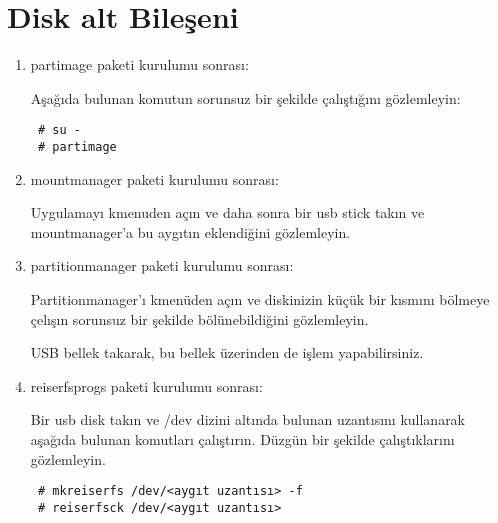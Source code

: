 \documentclass[a4paper,10pt]{article}
\begin{document}
\section{Disk alt Bileşeni}
\begin{enumerate}
 \item partimage paketi kurulumu sonrası:

Aşağıda bulunan komutun sorunsuz bir şekilde çalıştığını gözlemleyin:
\begin{verbatim}
 # su -
 # partimage
\end{verbatim}


 \item mountmanager paketi kurulumu sonrası:

Uygulamayı kmenuden açın ve daha sonra bir usb stick takın ve mountmanager'a bu aygıtın eklendiğini gözlemleyin.
 \item partitionmanager paketi kurulumu sonrası:

Partitionmanager'ı kmenüden açın ve diskinizin küçük bir kısmını bölmeye çelışın sorunsuz bir şekilde bölünebildiğini gözlemleyin.

USB bellek takarak, bu bellek üzerinden de işlem yapabilirsiniz.

\item reiserfsprogs paketi kurulumu sonrası:

Bir usb disk takın ve /dev dizini altında bulunan uzantısını kullanarak aşağıda bulunan komutları çalıştırın. Düzgün bir şekilde çalıştıklarını gözlemleyin. 

\begin{verbatim}
 # mkreiserfs /dev/<aygıt uzantısı> -f
 # reiserfsck /dev/<aygıt uzantısı>
\end{verbatim}

\end{enumerate}
\end{document}
